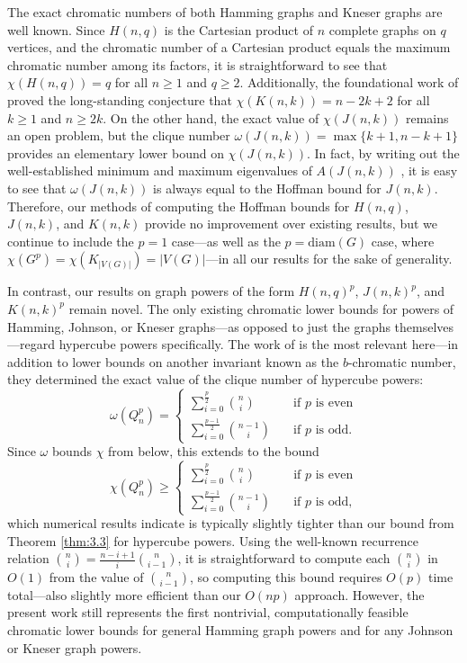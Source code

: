 \documentclass{article}
\numberwithin{equation}{section}
\theoremstyle{plain}
\begin{document}
The exact chromatic numbers of both Hamming graphs and Kneser graphs are well known. Since $H(n, q)$ is the Cartesian product of $n$ complete graphs on $q$ vertices, and the chromatic number of a Cartesian product equals the maximum chromatic number among its factors, it is straightforward to see that $\chi(H(n, q)) = q$ for all $n \ge 1$ and $q \ge 2$. Additionally, the foundational work of \cite{Lov78} proved the long-standing conjecture that $\chi(K(n, k)) = n - 2k + 2$ for all $k \ge 1$ and $n \ge 2k$. On the other hand, the exact value of $\chi(J(n, k))$ remains an open problem, but the clique number $\omega(J(n, k)) = \max\{k + 1, n - k + 1\}$ provides an elementary lower bound on $\chi(J(n, k))$. In fact, by writing out the well-established minimum and maximum eigenvalues of $A(J(n, k))$ \cite{Vor20}, it is easy to see that $\omega(J(n, k))$ is always equal to the Hoffman bound for $J(n, k)$. Therefore, our methods of computing the Hoffman bounds for $H(n, q)$, $J(n, k)$, and $K(n, k)$ provide no improvement over existing results, but we continue to include the $p = 1$ case---as well as the $p = \mathrm{diam}(G)$ case, where $\chi(G^p) = \chi(K_{\lvert V(G) \rvert}) = \lvert V(G) \rvert$---in all our results for the sake of generality.

In contrast, our results on graph powers of the form $H(n, q)^p$, $J(n, k)^p$, and $K(n, k)^p$ remain novel. The only existing chromatic lower bounds for powers of Hamming, Johnson, or Kneser graphs---as opposed to just the graphs themselves---regard hypercube powers specifically. The work of \cite{FFR17} is the most relevant here---in addition to lower bounds on another invariant known as the $b$-chromatic number, they determined the exact value of the clique number of hypercube powers:
\[\omega(Q_n^p) = \begin{cases}
    \sum_{i = 0}^{\frac{p}{2}} \binom{n}{i} \quad & \text{if } p \text{ is even} \\[6pt]
    \sum_{i = 0}^{\frac{p - 1}{2}} \binom{n - 1}{i} \quad & \text{if } p \text{ is odd.}
\end{cases}\]
Since $\omega$ bounds $\chi$ from below, this extends to the bound
\[\chi(Q_n^p) \ge \begin{cases}
    \sum_{i = 0}^{\frac{p}{2}} \binom{n}{i} \quad & \text{if } p \text{ is even} \\[6pt]
    \sum_{i = 0}^{\frac{p - 1}{2}} \binom{n - 1}{i} \quad & \text{if } p \text{ is odd,}
\end{cases}\]
which numerical results indicate is typically slightly tighter than our bound from Theorem \ref{thm:3.3} for hypercube powers. Using the well-known recurrence relation $\binom{n}{i} = \frac{n - i + 1}{i}\binom{n}{i - 1}$, it is straightforward to compute each $\binom{n}{i}$ in $O(1)$ from the value of $\binom{n}{i - 1}$, so computing this bound requires $O(p)$ time total---also slightly more efficient than our $O(np)$ approach. However, the present work still represents the first nontrivial, computationally feasible chromatic lower bounds for general Hamming graph powers and for any Johnson or Kneser graph powers.
\end{document}
